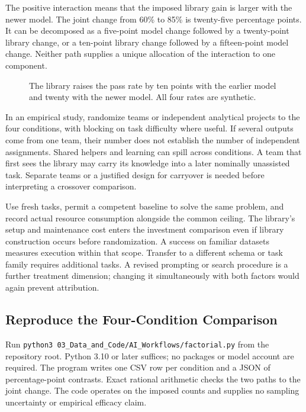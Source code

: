 The positive interaction means that the imposed library gain is larger
with the newer model. The joint change from 60\% to 85\% is twenty-five
percentage points. It can be decomposed as a five-point model change
followed by a twenty-point library change, or a ten-point library change
followed by a fifteen-point model change. Neither path supplies a unique
allocation of the interaction to one component.

\begin{figure}[htbp]
\centering

\caption{The library raises the pass rate by ten points with the earlier model and twenty with the newer model. All four rates are synthetic.}\label{fig:M06_ai_factorial}
\end{figure}

In an empirical study, randomize teams or independent analytical
projects to the four conditions, with blocking on task difficulty where
useful. If several outputs come from one team, their number does not
establish the number of independent assignments. Shared helpers and
learning can spill across conditions. A team that first sees the library
may carry its knowledge into a later nominally unassisted task. Separate
teams or a justified design for carryover is needed before interpreting
a crossover comparison.

Use fresh tasks, permit a competent baseline to solve the same problem,
and record actual resource consumption alongside the common ceiling. The
library's setup and maintenance cost enters the investment comparison
even if library construction occurs before randomization. A success on
familiar datasets measures execution within that scope. Transfer to a
different schema or task family requires additional tasks. A revised
prompting or search procedure is a further treatment dimension; changing
it simultaneously with both factors would again prevent attribution.

\hypertarget{M06-reproduce-the-four-condition-comparison}{%
\subsection{Reproduce the Four-Condition
Comparison}\label{M06-reproduce-the-four-condition-comparison}}

\noindent \noindent Run
\texttt{python3\ 03\_Data\_and\_Code/AI\_Workflows/factorial.py} from
the repository root. Python 3.10 or later suffices; no packages or model
account are required. The program writes one CSV row per condition and a
JSON of percentage-point contrasts. Exact rational arithmetic checks the
two paths to the joint change. The code operates on the imposed counts
and supplies no sampling uncertainty or empirical efficacy claim.

